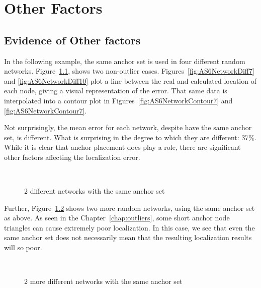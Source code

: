 \chapter{Other Factors}

\section{Evidence of Other factors}

In the following example, the same anchor set is used in four different random networks.  Figure~\ref{fig:AS6good}, shows two non-outlier cases.  Figures~\ref{fig:AS6NetworkDiff7} and \ref{fig:AS6NetworkDiff10} plot a line between the real and calculated location of each node, giving a visual representation of the error.  That same data is interpolated into a contour plot in Figures~\ref{fig:AS6NetworkContour7} and \ref{fig:AS6NetworkContour7}.

Not surprisingly, the mean error for each network, despite have the same anchor set, is different.  What is surprising in the degree to which they are different: 37\%.  While it is clear that anchor placement does play a role, there are significant other factors affecting the localization error.

\begin{figure}
  \centering
	\\
	\caption{2 different networks with the same anchor set}	
	\label{fig:AS6good}
\end{figure}

Further, Figure~\ref{fig:AS6bad} shows two more random networks, using the same anchor set as above.  As seen in the Chapter~\ref{chap:outliers}, some short anchor node triangles can cause extremely poor localization.  In this case, we see that even the same anchor set does not necessarily mean that the resulting localization results will so poor.  

\begin{figure}
  \centering
	\\
	\caption{2 more different networks with the same anchor set}	
	\label{fig:AS6bad}
\end{figure}

